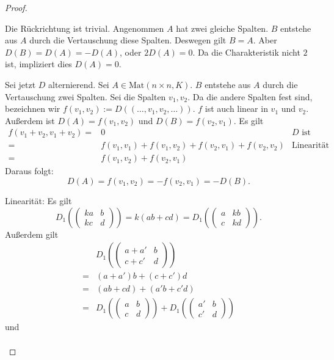 \begin{proof}
	\begin{parts}
	\item Die Rückrichtung ist trivial. Angenommen $A$ hat zwei gleiche Spalten. $B$ entstehe aus $A$ durch die Vertauschung diese Spalten. Deswegen gilt $B=A$. Aber $D(B)=D(A)=-D(A)$, oder $2D(A)=0$. Da die Charakteristik nicht $2$ ist, impliziert dies $D(A)=0$. 

		Sei jetzt $D$ alternierend. Sei $A\in\text{Mat}(n\times n, K)$. $B$ entstehe aus $A$ durch die Vertauschung zwei Spalten. Sei die Spalten $v_1,v_2$. Da die andere Spalten fest sind, bezeichnen wir $f(v_1,v_2):=D((\dots, v_1, v_2,\dots))$. $f$ ist auch linear in $v_1$ und $v_2$. Außerdem ist $D(A)=f(v_1,v_2)$ und $D(B)=f(v_2,v_1)$. Es gilt
		\begin{align*}
			f(v_1+v_2,v_1+v_2)=& 0 & D\text{ ist alternierend}\\
			=&f(v_1,v_1)+f(v_1,v_2)+f(v_2,v_1)+f(v_2,v_2) & \text{Linearität}\\
			=&f(v_1,v_2)+f(v_2,v_1)
		\end{align*}
		Daraus folgt:
		\[
		D(A)=f(v_1,v_2)=-f(v_2,v_1)=-D(B)
		.\] 
	\item Linearität: Es gilt
		\[
			D_1\left( \begin{pmatrix} k a & b \\ k c & d \end{pmatrix}  \right) = k(ab+cd)=D_1\left( \begin{pmatrix} a & kb \\ c & kd \end{pmatrix}  \right) 
		.\] 
		Außerdem gilt
		\begin{align*}
			&D_1\left( \begin{pmatrix} a+a' & b \\ c + c' & d \end{pmatrix}  \right)\\
			=&(a+a')b+(c+c')d\\
			=&(ab+cd)+(a'b+c'd)\\
			=&D_1\left( \begin{pmatrix} a & b \\ c & d \end{pmatrix}  \right) +D_1\left( \begin{pmatrix} a' & b \\ c' & d \end{pmatrix}  \right) 
		\end{align*}
		und
		\begin{align*}

\end{align*}
\end{parts}
\end{proof}
